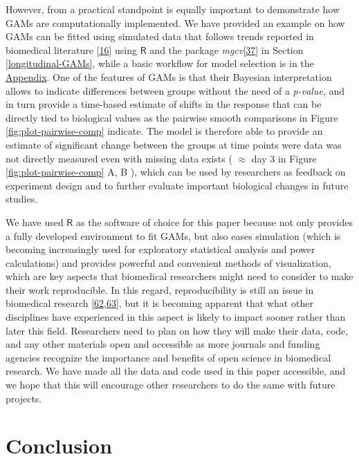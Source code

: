 \documentclass[
]{article}
\begin{document}
However, from a practical standpoint is equally important to demonstrate how GAMs are computationally implemented. We have provided an example on how GAMs can be fitted using simulated data that follows trends reported in biomedical literature {[}\protect\hyperlink{ref-vishwanath2009}{16}{]} using \(\textsf{R}\) and the package \emph{mgcv}{[}\protect\hyperlink{ref-wood2017}{37}{]} in Section \ref{longitudinal-GAMs}, while a basic workflow for model selection is in the \protect\hyperlink{workflow}{Appendix}. One of the features of GAMs is that their Bayesian interpretation allows to indicate differences between groups without the need of a \emph{p-value}, and in turn provide a time-based estimate of shifts in the response that can be directly tied to biological values as the pairwise smooth comparisons in Figure \ref{fig:plot-pairwise-comp} indicate. The model is therefore able to provide an estimate of significant change between the groups at time points were data was not directly measured even with missing data exists ( \(\approx\) day 3 in Figure \ref{fig:plot-pairwise-comp} A, B ), which can be used by researchers as feedback on experiment design and to further evaluate important biological changes in future studies.

We have used \(\textsf{R}\) as the software of choice for this paper because not only provides a fully developed environment to fit GAMs, but also eases simulation (which is becoming increasingly used for exploratory statistical analysis and power calculations) and provides powerful and convenient methods of visualization, which are key aspects that biomedical researchers might need to consider to make their work reproducible. In this regard, reproducibility is still an issue in biomedical research {[}\protect\hyperlink{ref-begley2015}{62},\protect\hyperlink{ref-weissgerber2018}{63}{]}, but it is becoming apparent that what other disciplines have experienced in this aspect is likely to impact sooner rather than later this field. Researchers need to plan on how they will make their data, code, and any other materials open and accessible as more journals and funding agencies recognize the importance and benefits of open science in biomedical research. We have made all the data and code used in this paper accessible, and we hope that this will encourage other researchers to do the same with future projects.

\FloatBarrier

\hypertarget{conclusion}{%
\section{Conclusion}\label{conclusion}}
\end{document}
